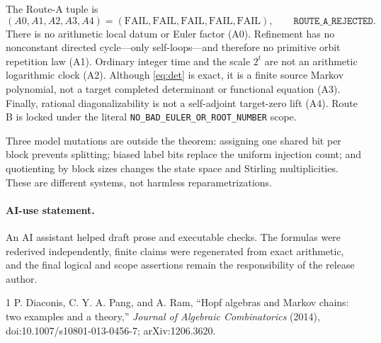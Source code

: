 \documentclass[10pt]{article}
\begin{document}
The Route-A tuple is
\[
 (A0,A1,A2,A3,A4)=(\mathrm{FAIL},\mathrm{FAIL},\mathrm{FAIL},
 \mathrm{FAIL},\mathrm{FAIL}),
 \qquad \texttt{ROUTE\_A\_REJECTED}.
\]
There is no arithmetic local datum or Euler factor (A0).  Refinement has no
nonconstant directed cycle---only self-loops---and therefore no primitive
orbit repetition law (A1).  Ordinary integer time and the scale $2^t$ are not
an arithmetic logarithmic clock (A2).  Although \eqref{eq:det} is exact, it
is a finite source Markov polynomial, not a target completed determinant or
functional equation (A3).  Finally, rational diagonalizability is not a
self-adjoint target-zero lift (A4).  Route B is locked under the literal
\texttt{NO\_BAD\_EULER\_OR\_ROOT\_NUMBER} scope.

Three model mutations are outside the theorem: assigning one shared bit per
block prevents splitting; biased label bits replace the uniform injection
count; and quotienting by block sizes changes the state space and Stirling
multiplicities.  These are different systems, not harmless reparametrizations.

\paragraph{AI-use statement.}
An AI assistant helped draft prose and executable checks.  The formulas were
rederived independently, finite claims were regenerated from exact arithmetic,
and the final logical and scope assertions remain the responsibility of the
release author.
\fi

\begin{thebibliography}{1}
P. Diaconis, C. Y. A. Pang, and A. Ram,
``Hopf algebras and Markov chains: two examples and a theory,''
\emph{Journal of Algebraic Combinatorics} (2014),
doi:10.1007/s10801-013-0456-7; arXiv:1206.3620.
\end{thebibliography}
\end{document}
